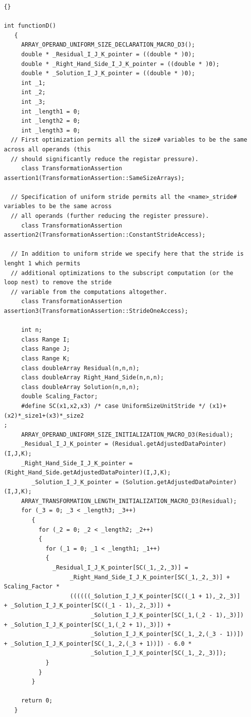 \documentclass[10pt]{article}
\begin{document}
\begin{lstlisting}{}

int functionD()
   { 
     ARRAY_OPERAND_UNIFORM_SIZE_DECLARATION_MACRO_D3(); 
     double * _Residual_I_J_K_pointer = ((double * )0); 
     double * _Right_Hand_Side_I_J_K_pointer = ((double * )0); 
     double * _Solution_I_J_K_pointer = ((double * )0); 
     int _1; 
     int _2; 
     int _3; 
     int _length1 = 0; 
     int _length2 = 0; 
     int _length3 = 0; 
  // First optimization permits all the size# variables to be the same across all operands (this
  // should significantly reduce the registar pressure).
     class TransformationAssertion assertion1(TransformationAssertion::SameSizeArrays); 

  // Specification of uniform stride permits all the <name>_stride# variables to be the same across
  // all operands (further reducing the register pressure).
     class TransformationAssertion assertion2(TransformationAssertion::ConstantStrideAccess); 

  // In addition to uniform stride we specify here that the stride is lenght 1 which permits
  // additional optimizations to the subscript computation (or the loop nest) to remove the stride
  // variable from the computations altogether.
     class TransformationAssertion assertion3(TransformationAssertion::StrideOneAccess); 

     int n;
     class Range I;
     class Range J;
     class Range K;
     class doubleArray Residual(n,n,n);
     class doubleArray Right_Hand_Side(n,n,n);
     class doubleArray Solution(n,n,n);
     double Scaling_Factor; 
     #define SC(x1,x2,x3) /* case UniformSizeUnitStride */ (x1)+(x2)*_size1+(x3)*_size2
; 
     ARRAY_OPERAND_UNIFORM_SIZE_INITIALIZATION_MACRO_D3(Residual); 
     _Residual_I_J_K_pointer = (Residual.getAdjustedDataPointer)(I,J,K); 
     _Right_Hand_Side_I_J_K_pointer = (Right_Hand_Side.getAdjustedDataPointer)(I,J,K); 
        _Solution_I_J_K_pointer = (Solution.getAdjustedDataPointer)(I,J,K); 
     ARRAY_TRANSFORMATION_LENGTH_INITIALIZATION_MACRO_D3(Residual); 
     for (_3 = 0; _3 < _length3; _3++)
        { 
          for (_2 = 0; _2 < _length2; _2++)
          { 
            for (_1 = 0; _1 < _length1; _1++)
            { 
              _Residual_I_J_K_pointer[SC(_1,_2,_3)] =
                   _Right_Hand_Side_I_J_K_pointer[SC(_1,_2,_3)] + Scaling_Factor * 
                   ((((((_Solution_I_J_K_pointer[SC((_1 + 1),_2,_3)]  + _Solution_I_J_K_pointer[SC((_1 - 1),_2,_3)]) + 
                         _Solution_I_J_K_pointer[SC(_1,(_2 - 1),_3)]) + _Solution_I_J_K_pointer[SC(_1,(_2 + 1),_3)]) +
                         _Solution_I_J_K_pointer[SC(_1,_2,(_3 - 1))]) + _Solution_I_J_K_pointer[SC(_1,_2,(_3 + 1))]) - 6.0 *
                         _Solution_I_J_K_pointer[SC(_1,_2,_3)]); 
            } 
          } 
        } 

     return 0;
   } 

\end{lstlisting}
\end{document}
